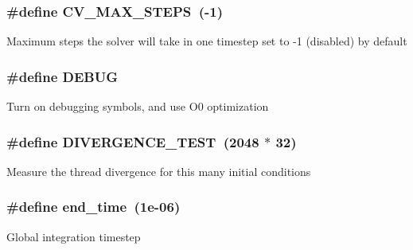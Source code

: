 \subsubsection[{\texorpdfstring{C\+V\+\_\+\+M\+A\+X\+\_\+\+S\+T\+E\+PS}{CV_MAX_STEPS}}]{\setlength{\rightskip}{0pt plus 5cm}\#define C\+V\+\_\+\+M\+A\+X\+\_\+\+S\+T\+E\+PS~(-\/1)}\hypertarget{solver__options_8cuh_a8dd330cbca99d70609ccc451d9099383}{}\label{solver__options_8cuh_a8dd330cbca99d70609ccc451d9099383}
Maximum steps the solver will take in one timestep set to -\/1 (disabled) by default 
\subsubsection[{\texorpdfstring{D\+E\+B\+UG}{DEBUG}}]{\setlength{\rightskip}{0pt plus 5cm}\#define D\+E\+B\+UG}\hypertarget{solver__options_8cuh_ad72dbcf6d0153db1b8d8a58001feed83}{}\label{solver__options_8cuh_ad72dbcf6d0153db1b8d8a58001feed83}
Turn on debugging symbols, and use O0 optimization 
\subsubsection[{\texorpdfstring{D\+I\+V\+E\+R\+G\+E\+N\+C\+E\+\_\+\+T\+E\+ST}{DIVERGENCE_TEST}}]{\setlength{\rightskip}{0pt plus 5cm}\#define D\+I\+V\+E\+R\+G\+E\+N\+C\+E\+\_\+\+T\+E\+ST~(2048 $\ast$ 32)}\hypertarget{solver__options_8cuh_afd8c973bc66908100d15f47ae514ed41}{}\label{solver__options_8cuh_afd8c973bc66908100d15f47ae514ed41}
Measure the thread divergence for this many initial conditions 
\subsubsection[{\texorpdfstring{end\+\_\+time}{end_time}}]{\setlength{\rightskip}{0pt plus 5cm}\#define end\+\_\+time~(1e-\/06)}\hypertarget{solver__options_8cuh_a25526ead9bdb589c90e7a8d3b4d1a746}{}\label{solver__options_8cuh_a25526ead9bdb589c90e7a8d3b4d1a746}
Global integration timestep 
